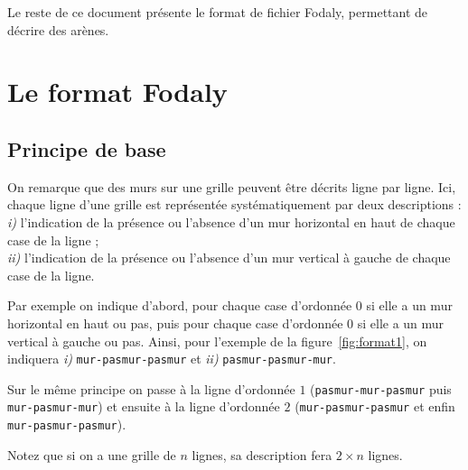 \documentclass[a4paper]{paper}
\newcommand{\nomFormat}{Fodaly}
\begin{document}
Le reste de ce document présente le format de fichier \nomFormat{}, permettant de décrire des arènes.

\section{Le format \nomFormat{}}

\subsection{Principe de base}

On remarque que des murs sur une grille peuvent être décrits ligne par ligne. 
Ici, chaque ligne d'une grille est représentée systématiquement par deux descriptions : \\
\textit{i)} l'indication de la présence ou l'absence d'un mur horizontal en haut de chaque case de la ligne ; \\
\textit{ii)} l'indication de la présence ou l'absence d'un mur vertical à gauche de chaque case de la ligne.

Par exemple on indique d'abord, pour chaque case d'ordonnée $0$ si elle a un mur horizontal en haut ou pas, puis pour chaque case d'ordonnée $0$ si elle a  un mur vertical à gauche ou pas.
Ainsi, pour l'exemple de la figure~\ref{fig:format1}, on indiquera \textit{i)} \verb|mur-pasmur-pasmur| et \textit{ii)} \verb|pasmur-pasmur-mur|.

Sur le même principe on passe à la ligne d'ordonnée $1$ (\verb|pasmur-mur-pasmur| puis \verb|mur-pasmur-mur|) et ensuite à la ligne d'ordonnée $2$ (\verb|mur-pasmur-pasmur| et enfin \verb|mur-pasmur-pasmur|).

Notez que si on a une grille de $n$ lignes, sa description fera $2 \times n$ lignes.
\end{document}
